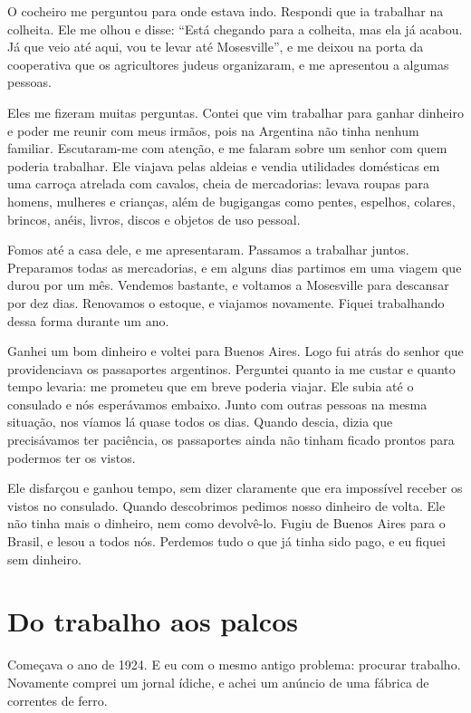 O cocheiro me perguntou para onde estava indo. Respondi que ia 
trabalhar na colheita. Ele me olhou e disse: ``Está chegando para a
colheita, mas ela já acabou. Já que veio até aqui, vou te levar até
Mosesville'', e me deixou na porta da cooperativa que os agricultores
judeus organizaram, e me apresentou a algumas pessoas.

Eles me fizeram muitas perguntas. Contei que vim trabalhar para ganhar dinheiro e poder me reunir com meus irmãos, pois 
na Argentina não tinha nenhum familiar. Escutaram-me com
atenção, e me falaram sobre um senhor com quem poderia trabalhar. Ele
viajava pelas aldeias e vendia utilidades domésticas em uma carroça
atrelada com cavalos, cheia de mercadorias: levava roupas para homens,
mulheres e crianças, além de bugigangas como pentes, espelhos, colares,
brincos, anéis, livros, discos e objetos de uso pessoal.

Fomos até a casa dele, e me apresentaram. Passamos a trabalhar juntos.
Preparamos todas as mercadorias, e em alguns dias partimos em uma viagem
que durou por um mês. Vendemos bastante, e voltamos a 
Mosesville para descansar por dez dias. Renovamos o estoque, e
viajamos novamente. Fiquei trabalhando dessa forma durante um ano.

Ganhei um bom dinheiro e voltei para Buenos Aires. Logo fui atrás do
senhor que providenciava os passaportes argentinos. Perguntei quanto ia me 
custar e quanto tempo levaria: me prometeu que em breve poderia viajar. 
Ele subia até o consulado e nós esperávamos embaixo. Junto com outras pessoas na mesma situação, nos víamos lá quase todos os dias. Quando descia, dizia
que precisávamos ter paciência, os passaportes ainda não tinham
ficado prontos para podermos ter os vistos.

Ele disfarçou e ganhou tempo, sem dizer claramente que era impossível
receber os vistos no consulado. Quando descobrimos pedimos
nosso dinheiro de volta. Ele não tinha mais o dinheiro, nem como devolvê-lo. Fugiu de Buenos
Aires para o Brasil, e lesou a todos nós. Perdemos tudo o que já tinha
sido pago, e eu fiquei sem dinheiro.

\chapter{Do trabalho aos palcos}

Começava o ano de 1924. E eu com o mesmo antigo problema: procurar
trabalho. Novamente comprei um jornal ídiche, e achei um anúncio de uma
fábrica de correntes de ferro.

